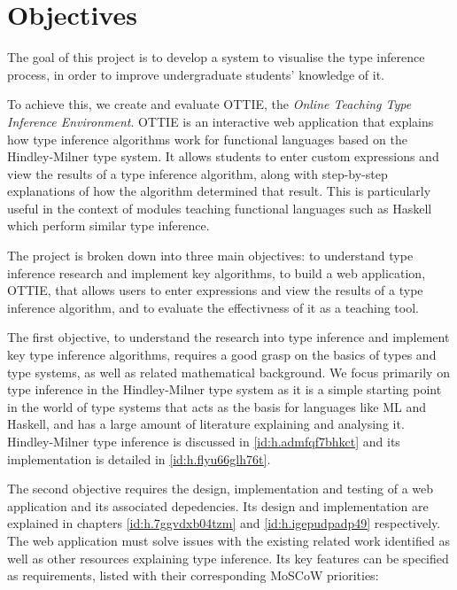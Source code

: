 \documentclass[a4paper,fleqn,oneside,12pt]{report}
\begin{document}
\section{Objectives}

The goal of this project is to develop a system to visualise the type inference process, in order to improve undergraduate students' knowledge of it.

To achieve this, we create and evaluate OTTIE, the \textit{Online Teaching Type Inference Environment}. OTTIE is an interactive web application that explains how type inference algorithms work for functional languages based on the Hindley-Milner type system. It allows students to enter custom expressions and view the results of a type inference algorithm, along with step-by-step explanations of how the algorithm determined that result. This is particularly useful in the context of modules teaching functional languages such as Haskell which perform similar type inference.

The project is broken down into three main objectives: to understand type inference research and implement key algorithms, to build a web application, OTTIE, that allows users to enter expressions and view the results of a type inference algorithm, and to evaluate the effectivness of it as a teaching tool.

The first objective, to understand the research into type inference and implement key type inference algorithms, requires a good grasp on the basics of types and type systems, as well as related mathematical background. We focus primarily on type inference in the Hindley-Milner type system as it is a simple starting point in the world of type systems that acts as the basis for languages like ML and Haskell, and has a large amount of literature explaining and analysing it. Hindley-Milner type inference is discussed in \cref{id:h.admfqf7bhkct} and its implementation is detailed in \cref{id:h.flyu66glh76t}.

The second objective requires the design, implementation and testing of a web application and its associated depedencies. Its design and implementation are explained in chapters \ref{id:h.7ggvdxb04tzm} and \ref{id:h.igepudpadp49} respectively. The web application must solve issues with the existing related work identified as well as other resources explaining type inference. Its key features can be specified as requirements, listed with their corresponding MoSCoW priorities:
\end{document}
